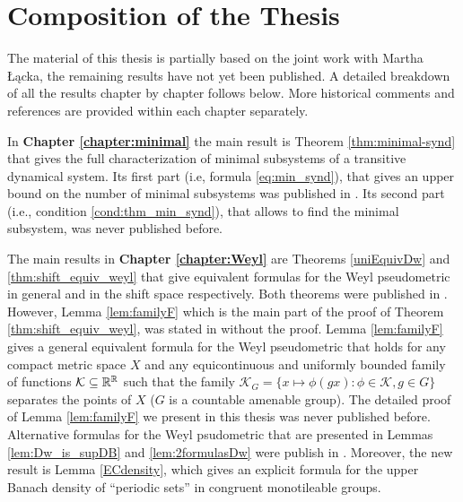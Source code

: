 \section*{Composition of the Thesis}
The material of this thesis is partially based on the joint work \cite{LS18} with Martha Łącka, the remaining results have not yet been published. A detailed breakdown of all the results chapter by chapter follows below. More historical comments and references are provided within each chapter separately.

In {\bf Chapter \ref{chapter:minimal}} the main result is Theorem \ref{thm:minimal-synd} that gives the full characterization of minimal subsystems of a transitive dynamical system. 
%
Its first part (i.e, formula \eqref{eq:min_synd}), that gives an upper bound on the number of minimal subsystems was published in \cite{LS18}.
%
Its second part (i.e., condition \eqref{cond:thm_min_synd}), that allows to find the minimal subsystem, was never published before.



The main results in {\bf Chapter \ref{chapter:Weyl}} are Theorems \ref{uniEquivDw} and \ref{thm:shift_equiv_weyl} that give equivalent formulas for the Weyl pseudometric in general and in the shift space respectively. Both theorems were published in \cite{LS18}. 
%
However, Lemma \ref{lem:familyF} which is the main part of the proof of Theorem \ref{thm:shift_equiv_weyl}, was stated in \cite{LS18} without the proof. 
%
Lemma \ref{lem:familyF} gives a general equivalent formula for the Weyl pseudometric that holds for any compact metric space $X$ and any equicontinuous and uniformly bounded family of functions $\mathcal{K}\subseteq \mathbb{R}^{\mathbb{R}}$ such that the family $\mathcal{K}_G=\{x\mapsto \phi(gx):\phi\in\mathcal{K}, g\in G\}$ separates the points of $X$ ($G$ is a countable amenable group). 
%
The detailed proof of Lemma \ref{lem:familyF} we present in this thesis was never published before. 
%
Alternative formulas for the Weyl psudometric that are presented in Lemmas \ref{lem:Dw_is_supDB} and \ref{lem:2formulasDw} were publish in \cite{LS18}.
%
Moreover, the new result is Lemma \ref{ECdensity}, which gives an explicit formula for the upper Banach density of ``periodic sets'' in congruent monotileable groups. 


